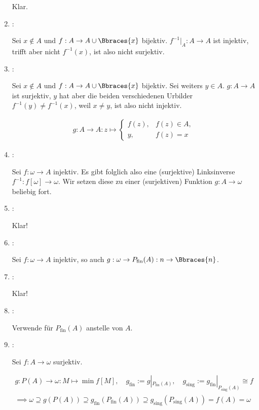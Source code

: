 \begin{solution}
\begin{enumerate}[label = \texttt{ad}]
  Klar.

  \item {}:

  Sei $x \not \in A$ und $f: A \to A \cup \Bbraces{x}$ bijektiv.
  $f^{-1} |_A: A \to A$ ist injektiv, trifft aber nicht $f^{-1}(x)$, ist also nicht surjektiv.

  \item {}:

  Sei $x \not \in A$ und $f: A \to A \cup \Bbraces{x}$ bijektiv.
  Sei weiters $y \in A$.
  $g: A \to A$ ist surjektiv, $y$ hat aber die beiden verschiedenen Urbilder $f^{-1}(y) \neq f^{-1}(x)$, weil $x \neq y$, ist also nicht injektiv.

  \begin{align*}
    g:
    A \to A:
    z
    \mapsto
    \begin{cases}
      f(z), & f(z) \in A, \\
      y,    & f(z) = x
    \end{cases}
  \end{align*}

  \item {}:
  
  Sei $f: \omega \to A$ injektiv.
  Es gibt folglich also eine (surjektive) Linksinverse $f^{-1}: f[\omega] \to \omega$.
  Wir setzen diese zu einer (surjektiven) Funktion $g: A \to \omega$ beliebig fort.

  \item {}:
  
  Klar!

  \item {}:

  Sei $f: \omega \to A$ injektiv, so auch $g: \omega \to P_\mathrm{fin}(A): n \to \Bbraces{n}$.

  \item {}:

  Klar!

  \item {}:

  Verwende  für $P_\mathrm{fin}(A)$ anstelle von $A$.

  \item {}:

  Sei $f: A \to \omega$ surjektiv.

  \begin{gather*}
    g:
    P(A) \to \omega:
    M \mapsto \min f[M],
    \quad
    g_\mathrm{fin} := g |_{P_\mathrm{fin}(A)},
    \quad
    g_\mathrm{sing} := g_\mathrm{fin} |_{P_\mathrm{sing}(A)} \cong f \\
    \implies
    \omega
    \supseteq
    g(P(A))
    \supseteq
    g_\mathrm{fin}(P_\mathrm{fin}(A))
    \supseteq
    g_\mathrm{sing}(P_\mathrm{sing}(A))
    =
    f(A)
    =
    \omega
  \end{gather*}


\end{enumerate}
\end{solution}
